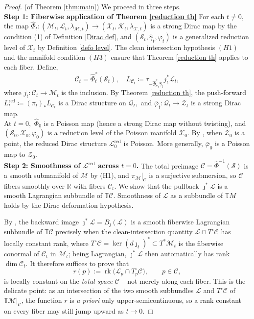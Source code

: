 \documentclass[reqno]{amsart}
\theoremstyle{plain}
\theoremstyle{definition}
\newcommand{\too}{\longrightarrow}
\newcommand{\rk}{\operatorname{rk}}
\newcommand{\C}{\mathcal{C}}
\renewcommand{\S}{\mathcal{S}}
\newcommand{\M}{\mathcal{M}}
\renewcommand{\L}{\mathcal{L}}
\newcommand{\jmapb}{\jmath}
\newcommand{\Z}{\mathcal{Z}}
\newcommand{\Phib}{\widehat{\Phi}}
\newcommand{\X}{\mathcal{X}}
\newcommand{\Q}{\mathcal{Q}}
\newcommand{\K}{\mathcal{K}}
\begin{document}
\begin{proof}(of Theorem \ref{thm:main})
We proceed in three steps.\\


\noindent\textbf{Step 1: Fiberwise application of Theorem \ref{reduction th}} For each $t\neq 0,$  the map $\widehat{\Phi}_t: (\M_t,\L_t,\lambda_{\M,t}) \too (\X_t,\K_t,\lambda_{\X,t})$ is a strong Dirac map by the condition (1) of Definition \ref{Dirac def}, and $(\S_t,\widehat{\gamma}_t,\varphi_t)$ is a generalized reduction level of $\X_t$ by Definition \ref{defo level}. The clean intersection hypothesis $(H1)$ and the manifold condition $(H3)$ ensure that Theorem \ref{reduction th} applies to each fiber. Define, \[
\mathcal{C}_t = \widehat{\Phi}_{t}^{*}(\S_t), \quad L_{\C_t} \coloneqq \tau_{-\widehat{\Phi}_{\C_t}^{*}\widehat{\gamma}_t} j_{t}^{*} \L_t,
\]
where $j_{t}: \C_t \too \M_t$ is the inclusion. By Theorem \ref{reduction th}, the push-forward $L^{\text{red}}_t \coloneqq (\pi_t)_{*}L_{\C_t}$ is a Dirac structure on $\Q_t,$ and $\bar{\varphi}_t: \Q_t \too \Z_t$ is a strong Dirac map.\\ At $t = 0,$ $\widehat{\Phi}_0$ is a Poisson map (hence a strong Dirac map without twisting), and $(\S_0,\X_0,\varphi_0)$ is a reduction level of the Poisson manifold $\X_0.$ By \cite[]{bualibanu2026reduction}, when $\Z_0$ is a point, the reduced Dirac structure $\L^{\text{red}}_0$ is Poisson. More generally, $\bar{\varphi}_0$ is a Poisson map to $\Z_0.$\\

\noindent\textbf{Step 2: Smoothness of $\mathcal{L}^{\mathrm{red}}$ across $t=0$.}
The total preimage $\C=\Phib^{-1}(\S)$ is a smooth submanifold of $\M$ by (H1), and $\pi_\M|_\C$ is a
surjective submersion, so $\C$ fibers smoothly over $\mathbb{R}$ with fibers $\C_t$. We show that the pullback $\jmapb^{\ast}\L$ is a smooth Lagrangian subbundle of $\mathbb{T}\C$. Smoothness of $\L$ as a subbundle of $\mathbb{T}M$ holds by the Dirac
deformation hypothesis.
 
By \cite[Proposition 5.6, Example 5.7]{bursztyn2013brief}, the backward image
$\jmapb^{\ast}\L=B_{\jmapb}(\L)$ is a smooth fiberwise Lagrangian subbundle of $\mathbb{T}\C$ precisely when the clean-intersection quantity $\L\cap T^{\circ}\C$ has locally constant rank, where $T^{\circ}\C = \ker(d\jmapb_t)^\ast\subset T^\ast \M_t$ is the
fiberwise conormal of $\C_t$ in $\M_t$; being Lagrangian, $\jmapb^{\ast}\L$ then automatically has rank $\dim \C_t$. It therefore suffices to prove that
\[
  r(p):=\rk\big(\L_p\cap T^{\circ}_{p}\C\big),\qquad p\in \C,
\]
is locally constant on the \emph{total space} $\C$ -- not merely along each fiber. This is the delicate point: as an intersection of the two smooth subbundles $\L$ and
$T^{\circ}\C$ of $\mathbb{T}\M|_\C$, the function $r$ is \emph{a priori} only upper-semicontinuous, so a rank constant on every fiber may still jump upward as $t\to 0$.
 

\end{proof}
\end{document}
